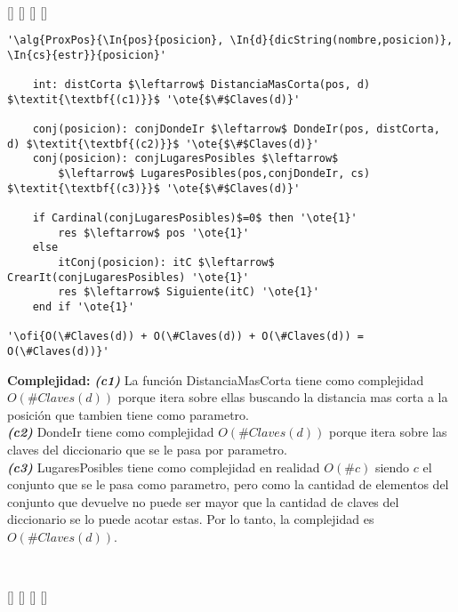 ~

[]
{}
[]
[]
[]

\begin{lstlisting}[mathescape]
'\alg{ProxPos}{\In{pos}{posicion}, \In{d}{dicString(nombre,posicion)}, \In{cs}{estr}}{posicion}'

	int: distCorta $\leftarrow$ DistanciaMasCorta(pos, d) $\textit{\textbf{(c1)}}$ '\ote{$\#$Claves(d)}'

	conj(posicion): conjDondeIr $\leftarrow$ DondeIr(pos, distCorta, d) $\textit{\textbf{(c2)}}$ '\ote{$\#$Claves(d)}'
	conj(posicion): conjLugaresPosibles $\leftarrow$
		$\leftarrow$ LugaresPosibles(pos,conjDondeIr, cs) $\textit{\textbf{(c3)}}$ '\ote{$\#$Claves(d)}'

	if Cardinal(conjLugaresPosibles)$=0$ then '\ote{1}'
		res $\leftarrow$ pos '\ote{1}'
	else
		itConj(posicion): itC $\leftarrow$ CrearIt(conjLugaresPosibles) '\ote{1}'
		res $\leftarrow$ Siguiente(itC) '\ote{1}'
	end if '\ote{1}'

'\ofi{O(\#Claves(d)) + O(\#Claves(d)) + O(\#Claves(d)) = O(\#Claves(d))}'
\end{lstlisting}

\textbf{Complejidad:} \textit{\textbf{(c1)}} La función DistanciaMasCorta tiene como complejidad $O(\#Claves(d))$ porque itera sobre ellas buscando la distancia mas corta a la posición que tambien tiene como parametro. \\
\textit{\textbf{(c2)}} DondeIr tiene como complejidad $O(\#Claves(d))$ porque itera sobre las claves del diccionario que se le pasa por parametro. \\
\textit{\textbf{(c3)}} LugaresPosibles tiene como complejidad en realidad $O(\#c)$ siendo $c$ el conjunto que se le pasa como parametro, pero como la cantidad de elementos del conjunto que devuelve no puede ser mayor que la cantidad de claves del diccionario se lo puede acotar estas. Por lo tanto, la complejidad es $O(\#Claves(d))$.

~

[]
{}
[]
[]
[]

